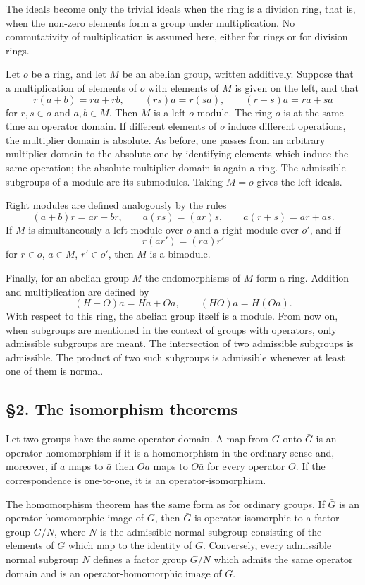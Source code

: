 \documentclass[
  12pt,
]{article}
\begin{document}
The ideals become only the trivial ideals when the ring is a division
ring, that is, when the non-zero elements form a group under
multiplication. No commutativity of multiplication is assumed here,
either for rings or for division rings.

Let \(o\) be a ring, and let \(M\) be an abelian group, written
additively. Suppose that a multiplication of elements of \(o\) with
elements of \(M\) is given on the left, and that \[
  r(a+b)=ra+rb,
  \qquad
  (rs)a=r(sa),
  \qquad
  (r+s)a=ra+sa
\] for \(r,s\in o\) and \(a,b\in M\). Then \(M\) is a left \(o\)-module.
The ring \(o\) is at the same time an operator domain. If different
elements of \(o\) induce different operations, the multiplier domain is
absolute. As before, one passes from an arbitrary multiplier domain to
the absolute one by identifying elements which induce the same
operation; the absolute multiplier domain is again a ring. The
admissible subgroups of a module are its submodules. Taking \(M=o\)
gives the left ideals.

Right modules are defined analogously by the rules \[
  (a+b)r=ar+br,
  \qquad
  a(rs)=(ar)s,
  \qquad
  a(r+s)=ar+as.
\] If \(M\) is simultaneously a left module over \(o\) and a right
module over \(o'\), and if \[
  r(ar')=(ra)r'
\] for \(r\in o\), \(a\in M\), \(r'\in o'\), then \(M\) is a bimodule.

Finally, for an abelian group \(M\) the endomorphisms of \(M\) form a
ring. Addition and multiplication are defined by \[
  (H+O)a=Ha+Oa,
  \qquad
  (HO)a=H(Oa).
\] With respect to this ring, the abelian group itself is a module. From
now on, when subgroups are mentioned in the context of groups with
operators, only admissible subgroups are meant. The intersection of two
admissible subgroups is admissible. The product of two such subgroups is
admissible whenever at least one of them is normal.

\subsection{§2. The isomorphism
theorems}\label{the-isomorphism-theorems}

Let two groups have the same operator domain. A map from \(G\) onto
\(\bar G\) is an operator-homomorphism if it is a homomorphism in the
ordinary sense and, moreover, if \(a\) maps to \(\bar a\) then \(Oa\)
maps to \(O\bar a\) for every operator \(O\). If the correspondence is
one-to-one, it is an operator-isomorphism.

The homomorphism theorem has the same form as for ordinary groups. If
\(\bar G\) is an operator-homomorphic image of \(G\), then \(\bar G\) is
operator-isomorphic to a factor group \(G/N\), where \(N\) is the
admissible normal subgroup consisting of the elements of \(G\) which map
to the identity of \(\bar G\). Conversely, every admissible normal
subgroup \(N\) defines a factor group \(G/N\) which admits the same
operator domain and is an operator-homomorphic image of \(G\).
\end{document}
